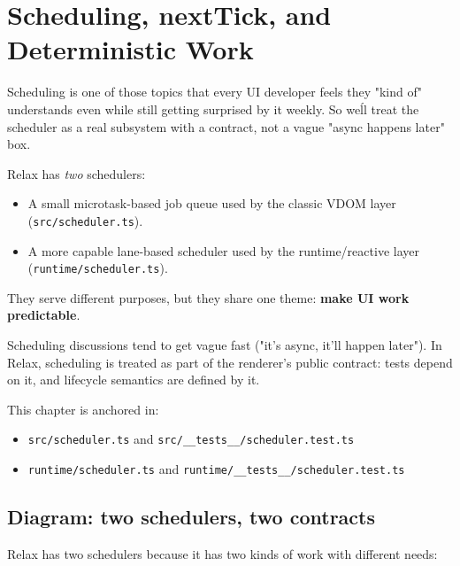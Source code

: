 \chapter{Scheduling, nextTick, and Deterministic Work}
\label{ch:scheduling}

Scheduling is one of those topics that every UI developer feels they "kind of" understands
even while still getting surprised by it weekly.
So we\'ll treat the scheduler as a real subsystem with a contract, not a vague "async happens later" box.

Relax has \emph{two} schedulers:

\begin{itemize}
  \item A small microtask-based job queue used by the classic VDOM layer (\texttt{src/scheduler.ts}).
  \item A more capable lane-based scheduler used by the runtime/reactive layer (\texttt{runtime/scheduler.ts}).
\end{itemize}

They serve different purposes, but they share one theme: \textbf{make UI work predictable}.

Scheduling discussions tend to get vague fast ("it’s async, it’ll happen later").
In Relax, scheduling is treated as part of the renderer’s public contract: tests depend on it, and lifecycle semantics are defined by it.

This chapter is anchored in:

\begin{itemize}
  \item \texttt{src/scheduler.ts} and \texttt{src/\_\_tests\_\_/scheduler.test.ts}
  \item \texttt{runtime/scheduler.ts} and \texttt{runtime/\_\_tests\_\_/scheduler.test.ts}
\end{itemize}

\section{Diagram: two schedulers, two contracts}
Relax has two schedulers because it has two kinds of work with different needs:


